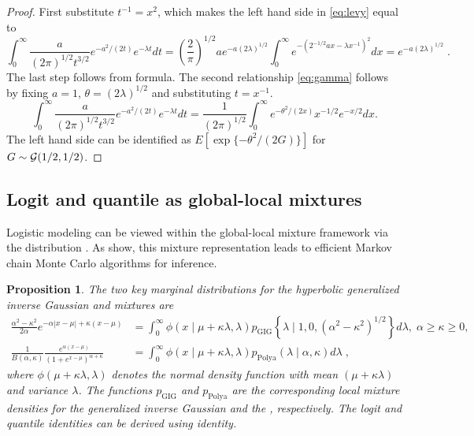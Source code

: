 \documentclass[11pt]{article}
\newtheorem{proposition}[theorem]{Proposition}
\begin{document}
\begin{proof}
First substitute $t^{-1} = x^2$, which makes the left hand side in \eqref{eq:levy} equal to 
\[
  \int_{0}^{\infty} \frac{a}{(2 \pi)^{1/2} t^{3/2}} e^{-{a^2}/({2 t})} e^{-\lambda t} dt = \left(\frac{2}{\pi}\right)^{1/2}ae^{-a (2 \lambda)^{1/2}} 
  \int_0^{\infty} e^{-({2}^{-1/2} ax - \lambda x^{-1})^2} dx = e^{-a (2 \lambda)^{1/2}}\;.
\]
The last step follows from \CS{} formula.  The second relationship \eqref{eq:gamma} follows by fixing $a = 1$, $\theta = (2\lambda)^{1/2}$ and
substituting $t = x^{-1}$.
\[
\int_{0}^{\infty} \frac{a}{(2 \pi)^{1/2} t^{3/2}} e^{-{a^2}/({2 t})} e^{-\lambda t} dt = \frac{1}{(2 \pi)^{1/2}} \int_{0}^{\infty} e^{-{\theta^2}/({2x})} 
x^{-1/2} e^{-x/2} dx.
\]
The left hand side can be identified as $E \left[ \exp\{-\theta^2/(2G)\} \right]$ for $G \sim \mathcal{G}(1/2, 1/2)$. 
\end{proof}

\subsection{Logit and quantile as global-local mixtures}

Logistic modeling can be viewed within the global-local mixture framework via the \PG{} distribution \citep{polson_bayesian_2013}. As \citet{polson_bayesian_2013} show, this mixture representation leads to efficient Markov chain Monte Carlo algorithms for inference. 
\begin{proposition}
The two key marginal distributions for the hyperbolic generalized inverse Gaussian \citep{barndorff1982normal} and \PG{} mixtures are
\begin{align}
 \frac{\alpha^2 - \kappa^2}{2\alpha} e^{-\alpha|x-\mu| + \kappa (x-\mu)} &= \int_0^{\infty} \phi(x \mid \mu + \kappa \lambda, \lambda) p_{\mathrm{GIG}}\left\{ \lambda \mid 1,0, (\alpha^2 - \kappa^2)^{1/2}\right\} d\lambda, \; \alpha \geq \kappa \geq 0, \label{eq:GIG}\\
\frac{1}{B(\alpha,\kappa)} \frac{e^{\alpha (x-\mu)}}{(1+e^{x-\mu})^{\alpha + \kappa}}&= \int_0^{\infty} \phi(x \mid \mu + \kappa \lambda, \lambda)p_{\mathrm{Polya}}(\lambda \mid \alpha,\kappa)  d\lambda\;, \label{eq:polya}
\end{align}
where $\phi(\mu + \kappa \lambda, \lambda)$ denotes the normal density function with mean $(\mu + \kappa \lambda)$ and variance $\lambda$.  The functions $p_{\mathrm{GIG}}$ and $p_{\mathrm{Polya}}$ are the corresponding local mixture densities for the generalized inverse Gaussian and the \PG{}, respectively. The logit and quantile identities can be derived using \CS{} identity. 
\end{proposition}
\end{document}
